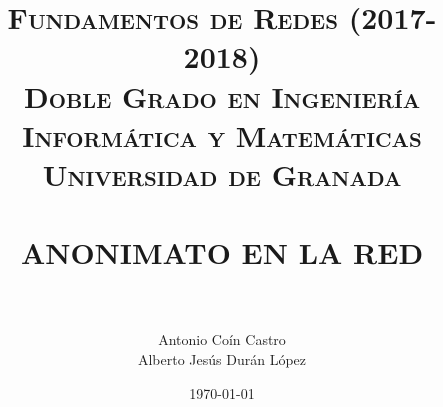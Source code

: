 


\title{	
	\normalfont \normalsize 
	\textsc{\textbf{Fundamentos de Redes (2017-2018)} \\ Doble Grado en Ingeniería Informática y Matemáticas \\ Universidad de Granada} \\ [25pt] %
	\horrule{0.5pt} \\[0.4cm] %
	\huge ANONIMATO EN LA RED \\ %
	\horrule{2pt} \\[0.5cm] %
}

\author{Antonio Coín Castro \\ Alberto Jesús Durán López} %
\date{\normalsize\today} %



	\maketitle 
	
	\newpage 
	
	\tableofcontents %
	
	
	
	\newpage

